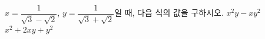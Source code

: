 $x=\dfrac{1}{\sqrt{3}-\sqrt{2}}$, $y=\dfrac{1}{\sqrt{3}+\sqrt{2}}$일 때, 다음 식의 값을 구하시오.
 $x^2y-xy^2$
 $x^2+2xy+y^2$
